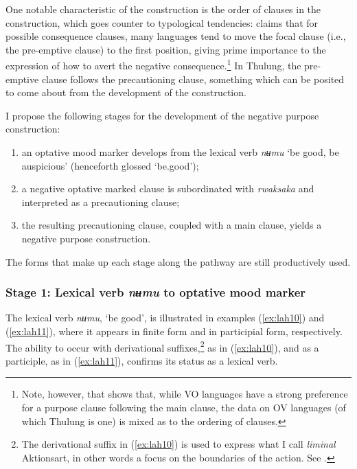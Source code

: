\documentclass[output=paper,colorlinks,citecolor=brown,
]{langscibook}
\begin{document}
One notable characteristic of the construction is the order of clauses in the construction, which goes counter to typological tendencies: \citet[39, 48]{dixon2009} claims that for possible consequence clauses, many languages tend to move the focal clause (i.e., the pre{}-emptive clause) to the first position, giving prime importance to the expression of how to avert the negative consequence.\footnote{Note, however, that \citet[113 ff]{Schmidtke-Bode2009} shows that, while VO languages have a strong preference for a purpose clause following the main clause, the data on OV languages (of which Thulung is one) is mixed as to the ordering of clauses.} In Thulung, the pre-emptive clause follows the precautioning clause, something which can be posited to come about from the development of the construction.

I propose the following stages for the development of the negative purpose construction:

\begin{enumerate}
    \item an optative mood marker develops from the lexical verb \textit{nʉmu} `be good, be auspicious' (henceforth glossed `be.good');
    \item a negative optative marked clause is subordinated with \textit{rwaksaka} and interpreted as a precautioning clause;
    \item the resulting precautioning clause, coupled with a main clause, yields a negative purpose construction.
\end{enumerate}

\noindent The forms that make up each stage along the pathway are still productively used. 

\subsubsection{Stage 1: Lexical verb \emph{nʉmu} to optative mood marker}
\label{subsubsec:stage1}

The lexical verb \textit{nʉmu}, `be good', is illustrated in examples (\ref{ex:lah10}) and (\ref{ex:lah11}), where it appears in finite form and in participial form, respectively. The ability to occur with derivational suffixes,\footnote{The derivational suffix in (\ref{ex:lah10}) is used to express what I call \textit{liminal} Aktionsart, in other words a focus on the boundaries of the action. See \citet{Lahaussois2020b,Lahaussois2020a}.} as in (\ref{ex:lah10}), and as a participle, as in (\ref{ex:lah11}), confirms its status as a lexical verb.
\end{document}
